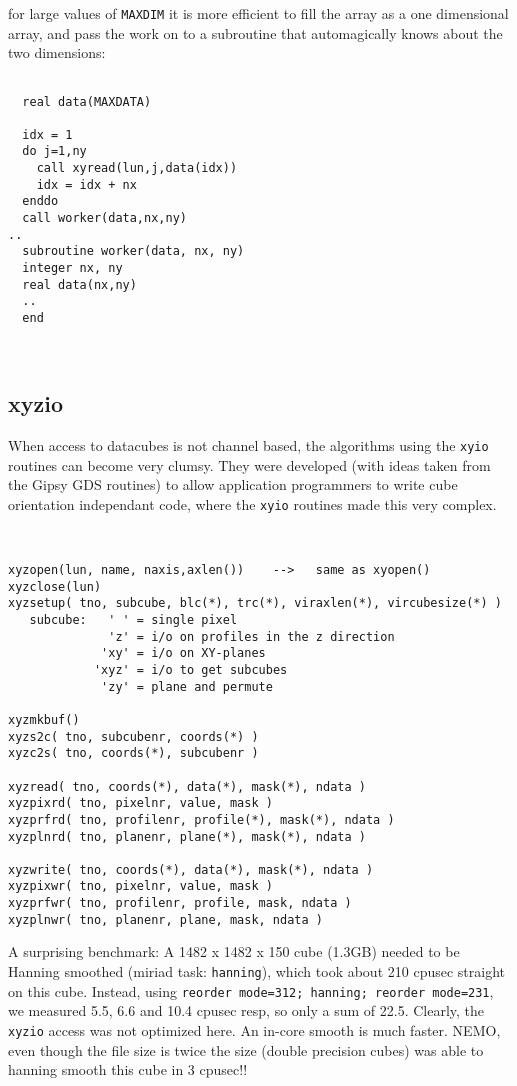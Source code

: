 \documentclass[preprint]{aastex} %
\begin{document}
for large values of {\tt MAXDIM} it is more efficient to fill
the array as a one dimensional array, and pass the work on to a
subroutine that automagically knows about the two dimensions:

\footnotesize
\begin{verbatim}

  real data(MAXDATA)

  idx = 1
  do j=1,ny
    call xyread(lun,j,data(idx))
    idx = idx + nx
  enddo
  call worker(data,nx,ny)
..
  subroutine worker(data, nx, ny)
  integer nx, ny
  real data(nx,ny)
  ..
  end
       
       
\end{verbatim}
\normalsize



\subsection{xyzio}

When access to datacubes is not channel based, the algorithms
using the {\tt xyio} routines can become very clumsy.  They
were developed (with ideas taken from the Gipsy GDS routines) to
allow application programmers to write cube orientation
independant code, where the {\tt xyio} routines made this
very complex.

\footnotesize
\begin{verbatim}


xyzopen(lun, name, naxis,axlen())    -->   same as xyopen()
xyzclose(lun)
xyzsetup( tno, subcube, blc(*), trc(*), viraxlen(*), vircubesize(*) )
   subcube:   ' ' = single pixel
              'z' = i/o on profiles in the z direction
             'xy' = i/o on XY-planes
            'xyz' = i/o to get subcubes
             'zy' = plane and permute 

xyzmkbuf()
xyzs2c( tno, subcubenr, coords(*) )
xyzc2s( tno, coords(*), subcubenr )

xyzread( tno, coords(*), data(*), mask(*), ndata )
xyzpixrd( tno, pixelnr, value, mask )
xyzprfrd( tno, profilenr, profile(*), mask(*), ndata )
xyzplnrd( tno, planenr, plane(*), mask(*), ndata )

xyzwrite( tno, coords(*), data(*), mask(*), ndata )
xyzpixwr( tno, pixelnr, value, mask )
xyzprfwr( tno, profilenr, profile, mask, ndata )
xyzplnwr( tno, planenr, plane, mask, ndata )

\end{verbatim}
\normalsize

A surprising benchmark:  A 1482 x 1482 x 150 cube (1.3GB) needed to be Hanning smoothed
(miriad task: {\tt hanning}), which took about 210 cpusec straight on this
cube. Instead, using {\tt reorder mode=312; hanning; reorder mode=231}, we measured
5.5, 6.6 and 10.4 cpusec resp, so only a sum of 22.5. Clearly, the {\tt xyzio} access
was not optimized here. An in-core smooth is much faster. NEMO, even though the file
size is twice the size (double precision cubes) was able to hanning smooth this
cube in 3 cpusec!!
\end{document}
